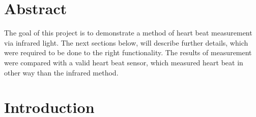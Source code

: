 \documentclass[11pt,a4paper]{article}
\begin{document}


\setlength{\parskip}{0pt}
\hypersetup{hidelinks}\tableofcontents
\setlength{\parskip}{0pt}

\newpage %

\section{Abstract}

The goal of this project is to demonstrate a method of heart beat measurement via infrared light. The next sections below, will describe further details, which were required to be done to the right functionality. The results of measurement were compared with a valid heart beat sensor, which measured heart beat in other way than the infrared method.

\section{Introduction}
\end{document}
